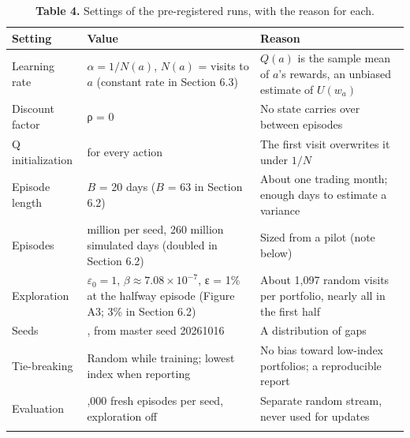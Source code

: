 \documentclass[
  11pt]{article}
\begin{document}
\begin{table}[htbp]
\centering\small
\caption{\textbf{Table 4.} Settings of the pre-registered runs, with the
reason for each.}
\begin{tabular}{@{}
  >{\raggedright\arraybackslash}p{}
  >{\raggedright\arraybackslash}p{}
  >{\raggedright\arraybackslash}p{}@{}}
\toprule\noalign{}
\begin{minipage}[b]{\linewidth}\raggedright
Setting
\end{minipage} & \begin{minipage}[b]{\linewidth}\raggedright
Value
\end{minipage} & \begin{minipage}[b]{\linewidth}\raggedright
Reason
\end{minipage} \\
\midrule\noalign{}
Learning rate & \(\alpha = 1/N(a)\), \(N(a)\) = visits to \(a\)
(constant rate in Section 6.3) & \(Q(a)\) is the sample mean of \(a\)'s
rewards, an unbiased estimate of \(U(w_a)\) \\
Discount factor & ρ = 0 & No state carries over between episodes \\
Q initialization & 0 for every action & The first visit overwrites it
under \(1/N\) \\
Episode length & \(B\) = 20 days (\(B\) = 63 in Section 6.2) & About one
trading month; enough days to estimate a variance \\
Episodes & 13 million per seed, 260 million simulated days (doubled in
Section 6.2) & Sized from a pilot (note below) \\
Exploration & \(\varepsilon_0 = 1\),
\(\beta \approx 7.08 \times 10^{-7}\), ε = 1\% at the halfway episode
(Figure A3; 3\% in Section 6.2) & About 1,097 random visits per
portfolio, nearly all in the first half \\
Seeds & 10, from master seed 20261016 & A distribution of gaps \\
Tie-breaking & Random while training; lowest index when reporting & No
bias toward low-index portfolios; a reproducible report \\
Evaluation & 10,000 fresh episodes per seed, exploration off & Separate
random stream, never used for updates \\
\bottomrule\noalign{}
\end{tabular}
\end{table}
\end{document}
